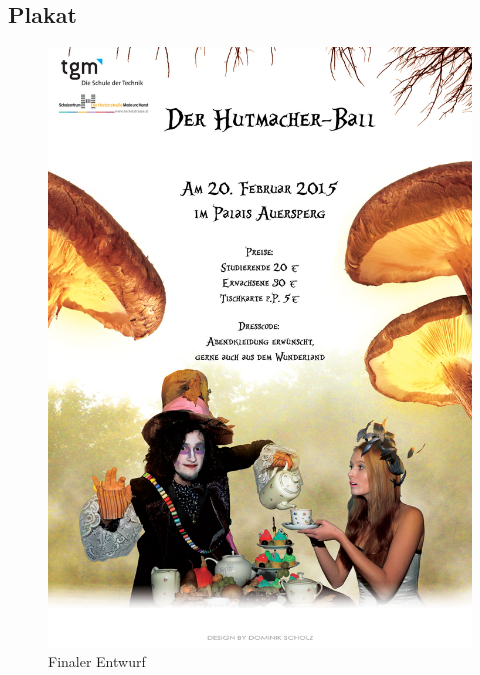 \documentclass[12pt]{article}
\begin{document}
\subsection{Plakat}
\begin{figure}[here!]
\centering
\begin{minipage}[h]{0.25\textwidth}
\centering
\includegraphics[width=1.0\textwidth]{versionbright_small}
    \caption{Finaler Entwurf}
    \label{fig:eai0}
\end{minipage}
\begin{minipage}[h]{0.25\textwidth}
\centering

\end{minipage}
\end{figure}
\end{document}
